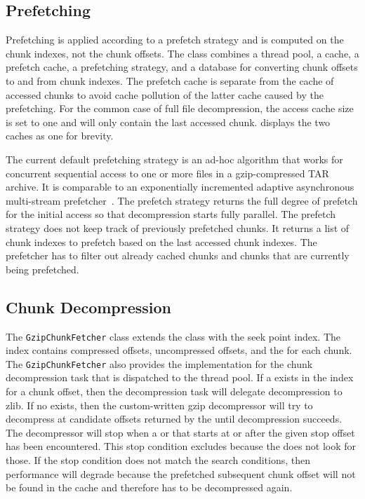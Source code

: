 \subsection{Prefetching}

Prefetching is applied according to a prefetch strategy and is computed on the chunk indexes, not the chunk offsets.
The \chunkfetcher class combines a thread pool, a cache, a prefetch cache, a prefetching strategy, and a database for converting chunk offsets to and from chunk indexes.
The prefetch cache is separate from the cache of accessed chunks to avoid cache pollution of the latter cache caused by the prefetching.
For the common case of full file decompression, the access cache size is set to one and will only contain the last accessed chunk.
 displays the two caches as one for brevity.

The current default prefetching strategy is an ad-hoc algorithm that works for concurrent sequential access to one or more files in a gzip-compressed TAR archive.
It is comparable to an exponentially incremented adaptive asynchronous multi-stream prefetcher~\cite{gill2007amp}.
The prefetch strategy returns the full degree of prefetch for the initial access so that decompression starts fully parallel.
The prefetch strategy does not keep track of previously prefetched chunks.
It returns a list of chunk indexes to prefetch based on the last accessed chunk indexes.
The prefetcher has to filter out already cached chunks and chunks that are currently being prefetched.


\subsection{Chunk Decompression}

The \texttt{GzipChunkFetcher} class extends the \chunkfetcher class with the seek point index.
The index contains compressed offsets, uncompressed offsets, and the \backrefwindow for each chunk.
The \texttt{Gzip\-Chunk\-Fetcher} also provides the implementation for the chunk decompression task that is dispatched to the thread pool.
If a \backrefwindow exists in the index for a chunk offset, then the decompression task will delegate decompression to zlib.
If no \backrefwindow exists, then the custom-written \pragzip gzip decompressor will try to decompress at candidate offsets returned by the \blockfinder until decompression succeeds.
The decompressor will stop when a \dynblock or \rawblock that starts at or after the given stop offset has been encountered.
This stop condition excludes \fixedblocks because the \blockfinder does not look for those.
If the stop condition does not match the \blockfinder search conditions, then performance will degrade because the prefetched subsequent chunk offset will not be found in the cache and therefore has to be decompressed again.

